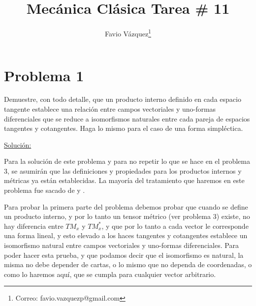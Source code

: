 \documentclass[a4paper,10pt]{article}
\title{Mecánica Clásica Tarea \# 11}
\author{Favio Vázquez\thanks{Correo: favio.vazquezp@gmail.com}}\affil{Instituto de Ciencias Nucleares. Universidad Nacional Autónoma de México.}
\date{}
\numberwithin{equation}{section}
\begin{document}
\makeatletter
\def\@maketitle{%
  \newpage
  \null
  \vskip 2em%
  \begin{center}%
  \let \footnote \thanks
    {\Large\bfseries \@title \par}%
    \vskip 1.5em%
    {\normalsize
      \lineskip .5em%
      \begin{tabular}[t]{c}%
        \@author
      \end{tabular}\par}%
    \vskip 1em%
    {\normalsize \@date}%
  \end{center}%
  \par
  \vskip 1.5em}
\makeatother

\maketitle

\section{Problema 1}

Demuestre, con todo detalle, que un producto interno definido en cada espacio tangente 
establece una relación entre campos vectoriales y uno-formas diferenciales que se reduce 
a isomorfismos naturales entre cada pareja de espacios tangentes y cotangentes. Haga lo 
mismo para el caso de una forma simpléctica. 

\vspace{.3cm}

\underline{Solución:} \vspace{.3cm}

Para la solución de este problema y para no repetir lo que se hace en el
problema 3, se asumirán que las definiciones y propiedades para los productos 
internos y métricas ya están establecidas. La mayoría del tratamiento 
que haremos en este problema fue sacado de \cite{rasband} y \cite{spivak}.

\vspace{.3cm}

Para probar la primera parte del problema debemos probar que cuando 
se define un producto interno, y por lo tanto un tensor métrico (ver problema 3) 
existe, no hay diferencia entre $TM_x$ y $TM_x^*$, y que por lo tanto 
a cada vector le corresponde una forma lineal, y esto elevado a los haces 
tangentes y cotangentes establece un isomorfismo natural entre campos vectoriales 
y uno-formas diferenciales. Para poder hacer esta prueba, y que podamos decir 
que el isomorfismo es natural, la misma no debe depender de cartas, o lo mismo 
que no dependa de coordenadas, o como lo haremos aquí, que se cumpla para 
cualquier vector arbitrario.
\end{document}

